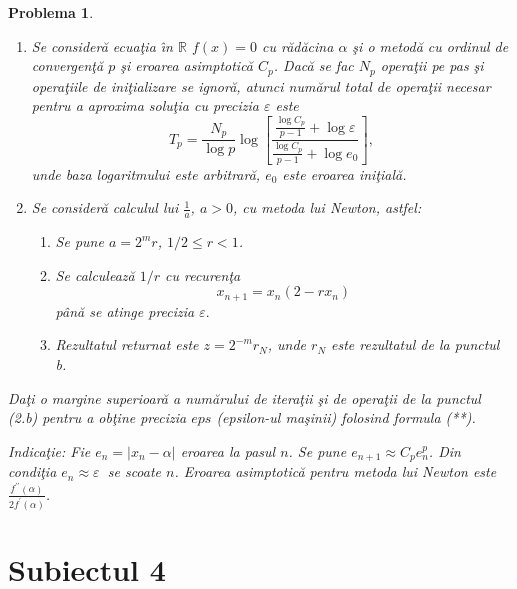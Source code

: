 \documentclass{article}%
\newtheorem{problem}[theorem]{Problema}
\begin{document}
\begin{problem}
\begin{enumerate}
\item Se consider\u{a} ecua\c{t}ia \^{\i}n $\mathbb{R}$ $f(x)=0$ cu
r\u{a}d\u{a}cina $\alpha$ \c{s}i o metod\u{a} cu ordinul de
convergen\c{t}\u{a} $p$ \c{s}i eroarea asimptotic\u{a} $C_{p}$. Dac\u{a} se
fac $N_{p}$ opera\c{t}ii pe pas \c{s}i opera\c{t}iile de ini\c{t}ializare se
ignor\u{a}, atunci num\u{a}rul total de opera\c{t}ii necesar pentru a aproxima
solu\c{t}ia cu precizia $\varepsilon$ este%
\begin{equation}
T_{p}=\frac{N_{p}}{\log p}\log\left[  \frac{\frac{\log C_{p}}{p-1}%
+\log\varepsilon}{\frac{\log C_{p}}{p-1}+\log e_{0}}\right]  ,\tag{**}%
\end{equation}
unde baza logaritmului este arbitrar\u{a}, $e_{0}$ este eroarea ini\c{t}ial\u{a}.

\item Se consider\u{a} calculul lui $\frac{1}{a}$, $a>0$, cu metoda lui
Newton, astfel:

\begin{enumerate}
\item Se pune $a=2^{m}r$, $1/2\leq r<1$.

\item Se calculeaz\u{a} $1/r$ cu recuren\c{t}a
\[
x_{n+1}=x_{n}\left(  2-rx_{n}\right)
\]
p\^{a}n\u{a} se atinge precizia $\varepsilon.$

\item Rezultatul returnat este $z=2^{-m}r_{N}$, unde $r_{N}$ este rezultatul
de la punctul b.
\end{enumerate}
\end{enumerate}

Da\c{t}i o margine superioar\u{a} a num\u{a}rului de itera\c{t}ii \c{s}i de
opera\c{t}ii de la punctul (2.b) pentru a ob\c{t}ine precizia $eps$
(epsilon-ul ma\c{s}inii) folosind formula (**).

\emph{Indica\c{t}ie}: Fie $e_{n}=|x_{n}-\alpha|$ eroarea la pasul $n$. Se pune
$e_{n+1}\approx C_{p}e_{n}^{p}$. Din condi\c{t}ia $e_{n}\approx\varepsilon$
$\ $se scoate $n$. Eroarea asimptotic\u{a} pentru metoda lui Newton este
$\frac{f^{\prime\prime}(\alpha)}{2f^{\prime}(\alpha)}$.
\end{problem}

\newpage

\section{Subiectul 4}
\end{document}
